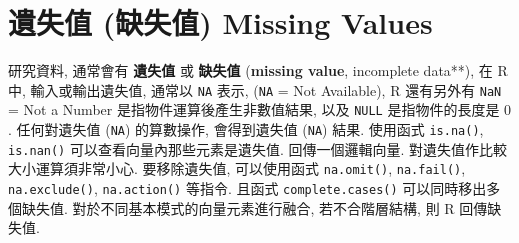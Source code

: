 \documentclass[
]{book}
\begin{document}
\hypertarget{ux907aux5931ux503c-ux7f3aux5931ux503c-missing-values}{%
\section{遺失值 (缺失值) Missing Values}\label{ux907aux5931ux503c-ux7f3aux5931ux503c-missing-values}}

研究資料,
通常會有
\textbf{遺失值}
或
\textbf{缺失值}
(\textbf{missing value},
incomplete data**),
在 R 中, 輸入或輸出遺失值,
通常以
\texttt{NA} 表示,
(\texttt{NA} = Not Available),
R 還有另外有
\texttt{NaN} = Not a Number
是指物件運算後產生非數值結果,
以及
\texttt{NULL}
是指物件的長度是 \(0\).
任何對遺失值
(\texttt{NA}) 的算數操作,
會得到遺失值
(\texttt{NA})
結果.
使用函式
\texttt{is.na()},
\texttt{is.nan()}
可以查看向量內那些元素是遺失值.
回傳一個邏輯向量.
對遺失值作比較大小運算須非常小心.
要移除遺失值, 可以使用函式
\texttt{na.omit()},
\texttt{na.fail()},
\texttt{na.exclude()},
\texttt{na.action()}
等指令.
且函式 \texttt{complete.cases()} 可以同時移出多個缺失值.
對於不同基本模式的向量元素進行融合,
若不合階層結構,
則 R 回傳缺失值.
\end{document}
